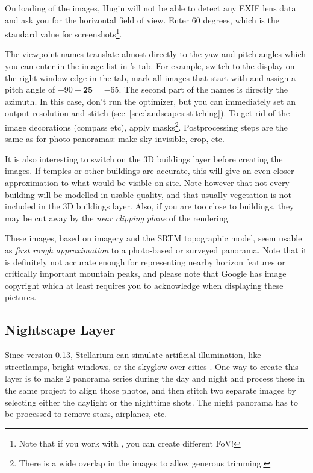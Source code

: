 On loading of the images, Hugin will not be able to detect any EXIF
lens data and ask you for the horizontal field of view. Enter 60
degrees, which is the standard value for 
screenshots\footnote{Note that if you work with , you
  can create different FoV!}.

The viewpoint names translate almost directly to the yaw and pitch
angles which you can enter in the image list in 's
 tab. For example, switch to the  display
on the right window edge in the  tab, mark all images that
start with  and assign a pitch angle of
$-90+\mathbf{25}=-65$. The second part of the names is directly the
azimuth.  In this case, don't run the optimizer, but you can
immediately set an output resolution and stitch
(see~\ref{sec:landscapes:stitching}). To get rid of the image
decorations (compass etc), apply masks\footnote{There is a wide
  overlap in the images to allow generous trimming.}. Postprocessing
steps are the same as for photo-panoramas: make sky invisible, crop,
etc.

It is also interesting to switch on the 3D buildings layer before
creating the images. If temples or other buildings are accurate, this
will give an even closer approximation to what would be visible
on-site. Note however that not every building will be modelled in
usable quality, and that usually vegetation is not included in the 3D
buildings layer. Also, if you are too close to buildings, they may be
cut away by the \emph{near clipping plane} of the rendering.

These images, based on  imagery and the SRTM
topographic model, seem usable as \emph{first rough approximation} to
a photo-based or surveyed panorama. Note that it is definitely not
accurate enough for representing nearby horizon features or critically
important mountain peaks, and please note that Google has image
copyright which at least requires you to acknowledge when displaying
these pictures.

\subsection{Nightscape Layer}
\label{sec:landscapes:landscapes:Nightscape}

Since version 0.13, Stellarium can simulate artificial illumination,
like streetlamps, bright windows, or the skyglow over cities
\citep{Zotti-Wuchterl:SEAC2014}. One way to
create this layer is to make 2 panorama series during the day and night
and process these in the same  project to align those photos,
and then stitch two separate images by selecting either the daylight or the
nighttime shots. The night panorama has to be processed to remove
stars, airplanes, etc.

